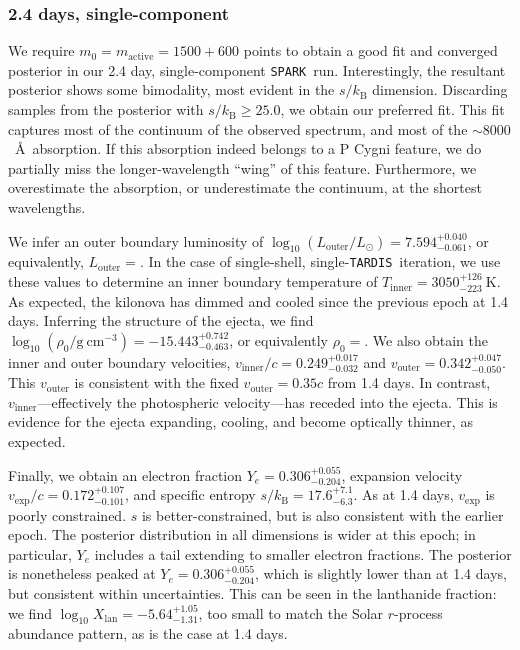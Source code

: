 \documentclass[twocolumn, twocolappendix]{aastex63}
\def\SPARK{\texttt{SPARK}}
\def\TARDIS{\texttt{TARDIS}}
\begin{document}
\subsubsection{2.4 days, single-component}\label{sssc:2.4_single}

We require $m_0 = m_{\mathrm{active}} = 1500 + 600$ points to obtain a good fit and converged posterior in our 2.4 day, single-component \SPARK~run. Interestingly, the resultant posterior shows some bimodality, most evident in the $s/k_{\mathrm{B}}$ dimension. Discarding samples from the posterior with $s/k_{\mathrm{B}} \geqslant 25.0$, we obtain our preferred fit. This fit captures most of the continuum of the observed spectrum, and most of the $\sim8000$~\AA~absorption. If this absorption indeed belongs to a P Cygni feature, we do partially miss the longer-wavelength ``wing'' of this feature. Furthermore, we overestimate the absorption, or underestimate the continuum, at the shortest wavelengths. 

We infer an outer boundary luminosity of $\log_{10} (L_{\mathrm{outer}}/L_{\odot}) = 7.594^{+0.040}_{-0.061}$, or equivalently, $L_{\mathrm{outer}} = $. In the case of single-shell, single-\TARDIS~iteration, we use these values to determine an inner boundary temperature of $T_{\mathrm{inner}} = 3050^{+126}_{-223}~\mathrm{K}$. As expected, the kilonova has dimmed and cooled since the previous epoch at 1.4 days. Inferring the structure of the ejecta, we find $\log_{10} (\rho_0 / \mathrm{g~cm^{-3}}) = -15.443^{+0.742}_{-0.463}$, or equivalently $\rho_0 = $. We also obtain the inner and outer boundary velocities, $v_{\mathrm{inner}}/c = 0.249^{+0.017}_{-0.032}$ and $v_{\mathrm{outer}} = 0.342^{+0.047}_{-0.050}$. This $v_{\mathrm{outer}}$ is consistent with the fixed $v_{\mathrm{outer}} = 0.35c$ from 1.4 days. In contrast, $v_{\mathrm{inner}}$---effectively the photospheric velocity---has receded into the ejecta. This is evidence for the ejecta expanding, cooling, and become optically thinner, as expected.  

Finally, we obtain an electron fraction $Y_e = 0.306^{+0.055}_{-0.204}$, expansion velocity $v_{\mathrm{exp}}/c = 0.172^{+0.107}_{-0.101}$, and specific entropy $s/k_{\mathrm{B}} = 17.6^{+7.1}_{-6.3}$. As at 1.4 days, $v_{\mathrm{exp}}$ is poorly constrained. $s$ is better-constrained, but is also consistent with the earlier epoch. The posterior distribution in all dimensions is wider at this epoch; in particular, $Y_e$ includes a tail extending to smaller electron fractions. The posterior is nonetheless peaked at $Y_e = 0.306^{+0.055}_{-0.204}$, which is slightly lower than at 1.4 days, but consistent within uncertainties. This can be seen in the lanthanide fraction: we find $\log_{10} X_{\mathrm{lan}} = -5.64^{+1.05}_{-1.31}$, too small to match the Solar $r$-process abundance pattern, as is the case at 1.4 days.
\end{document}
